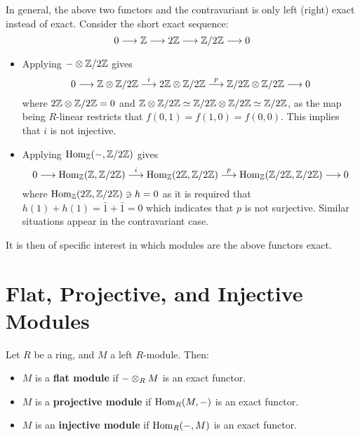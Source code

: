 \documentclass{article}
\begin{document}
In general, the above two functors and the contravariant is only left (right) exact instead of exact. Consider the short exact sequence:
\[
    0 \longrightarrow \mathbb{Z} \longrightarrow 2\mathbb{Z} \longrightarrow \mathbb{Z}/2\mathbb{Z} \longrightarrow 0
\]
\begin{itemize}
    \item Applying $- \otimes \mathbb{Z}/2\mathbb{Z}$ gives
    \[
        0 \longrightarrow \mathbb{Z} \otimes \mathbb{Z}/2\mathbb{Z} \overset{i}{\longrightarrow} 2\mathbb{Z} \otimes \mathbb{Z}/2\mathbb{Z} \overset{p}{\longrightarrow} \mathbb{Z}/2\mathbb{Z} \otimes \mathbb{Z}/2\mathbb{Z} \longrightarrow 0
    \]
    where $2\mathbb{Z} \otimes \mathbb{Z}/2\mathbb{Z} = 0$ and $\mathbb{Z} \otimes \mathbb{Z}/2\mathbb{Z} \simeq \mathbb{Z}/2\mathbb{Z} \otimes \mathbb{Z}/2\mathbb{Z} \simeq \mathbb{Z}/2\mathbb{Z}$, as the map being $R$-linear restricts that $f(0, 1) = f(1, 0) = f(0, 0)$. This implies that $i$ is not injective.
    \item Applying $\mathrm{Hom}_{\mathbb{Z}}(-, \mathbb{Z}/2\mathbb{Z})$ gives
    \[
        0 \longrightarrow \mathrm{Hom}_{\mathbb{Z}}(\mathbb{Z}, \mathbb{Z}/2\mathbb{Z}) \overset{i}{\longrightarrow} \mathrm{Hom}_{\mathbb{Z}}(2\mathbb{Z}, \mathbb{Z}/2\mathbb{Z}) \overset{p}{\longrightarrow} \mathrm{Hom}_{\mathbb{Z}}(\mathbb{Z}/2\mathbb{Z}, \mathbb{Z}/2\mathbb{Z}) \longrightarrow 0
    \]
    where $\mathrm{Hom}_{\mathbb{Z}}(2\mathbb{Z}, \mathbb{Z}/2\mathbb{Z}) \ni h = 0$ as it is required that $h(1) + h(1) = \bar{1} + \bar{1} = 0$ which indicates that $p$ is not surjective. Similar situations appear in the contravariant case.
\end{itemize}

It is then of specific interest in which modules are the above functors exact.

\section{Flat, Projective, and Injective Modules}

\begin{definition}
    Let $R$ be a ring, and $M$ a left $R$-module. Then:
    \begin{itemize}
        \item $M$ is a \textbf{flat module} if $- \otimes_R M$ is an exact functor.
        \item $M$ is a \textbf{projective module} if $\mathrm{Hom}_R(M, -)$ is an exact functor.
        \item $M$ is an \textbf{injective module} if $\mathrm{Hom}_R(-, M)$ is an exact functor.
    \end{itemize}
\end{definition}
\end{document}
